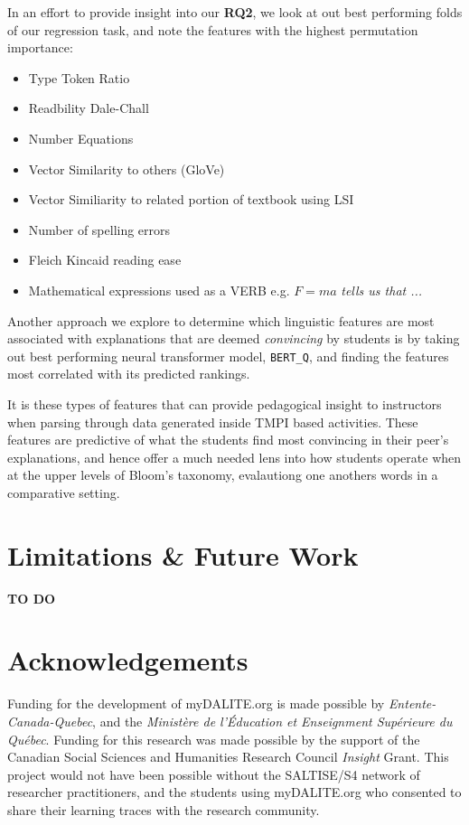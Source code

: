 \documentclass[notitlepage,12pt]{jedm}
\begin{document}
In an effort to provide insight into our \textbf{RQ2}, we look at out best 
performing folds of our regression task, and note the features with the highest 
permutation importance:

\begin{itemize}
	\item Type Token Ratio
	\item Readbility Dale-Chall
	\item Number Equations
	\item Vector Similarity to others (GloVe)
	\item Vector Similiarity to related portion of textbook using LSI
	\item Number of spelling errors
	\item Fleich Kincaid reading ease
	\item Mathematical expressions used as a VERB e.g. $F=ma$ \textit{tells us 
	that ...}
\end{itemize}

Another approach we explore to determine which linguistic features are most 
associated with explanations that are deemed \textit{convincing} by students is 
by taking out best performing neural transformer model, \verb|BERT_Q|, and 
finding the features most correlated with its predicted rankings. 


It is these types of features that can provide pedagogical insight to 
instructors when parsing through data generated inside TMPI based activities.
These features are predictive of what the students find most convincing in 
their peer's explanations, and hence offer a much needed lens into how students 
operate when at the upper levels of Bloom's taxonomy, evalautiong one anothers 
words in a comparative setting.

\section{Limitations \& Future Work}

\textbf{TO DO}

\section{Acknowledgements}
Funding for the development of myDALITE.org is made possible by 
\textit{Entente-Canada-Quebec}, and the \textit{Ministère de l'Éducation et 
Enseignment Supérieure du Québec}. Funding for this research was made possible 
by the support of the Canadian Social Sciences and Humanities Research Council 
\textit{Insight} Grant. This project would not have been possible without the 
SALTISE/S4 network of researcher practitioners, and the students using 
myDALITE.org who consented to share their learning traces with the research 
community.

 




\end{document}

